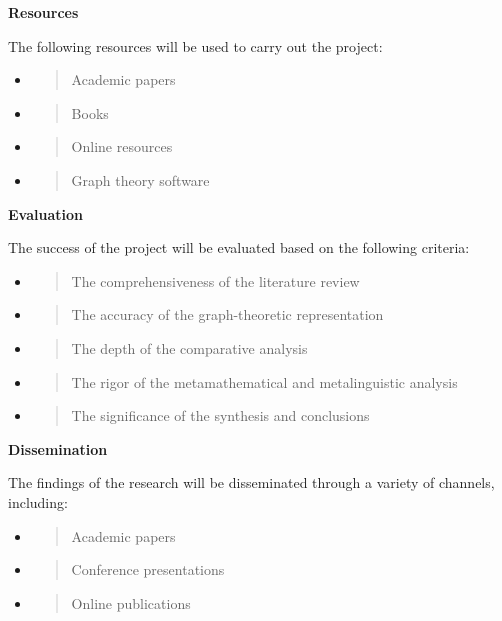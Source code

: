 \textbf{Resources}

The following resources will be used to carry out the project:

\begin{itemize}
\item
  \begin{quote}
  Academic papers
  \end{quote}
\item
  \begin{quote}
  Books
  \end{quote}
\item
  \begin{quote}
  Online resources
  \end{quote}
\item
  \begin{quote}
  Graph theory software
  \end{quote}
\end{itemize}

\textbf{Evaluation}

The success of the project will be evaluated based on the following
criteria:

\begin{itemize}
\item
  \begin{quote}
  The comprehensiveness of the literature review
  \end{quote}
\item
  \begin{quote}
  The accuracy of the graph-theoretic representation
  \end{quote}
\item
  \begin{quote}
  The depth of the comparative analysis
  \end{quote}
\item
  \begin{quote}
  The rigor of the metamathematical and metalinguistic analysis
  \end{quote}
\item
  \begin{quote}
  The significance of the synthesis and conclusions
  \end{quote}
\end{itemize}

\textbf{Dissemination}

The findings of the research will be disseminated through a variety of
channels, including:

\begin{itemize}
\item
  \begin{quote}
  Academic papers
  \end{quote}
\item
  \begin{quote}
  Conference presentations
  \end{quote}
\item
  \begin{quote}
  Online publications
  \end{quote}
\end{itemize}

